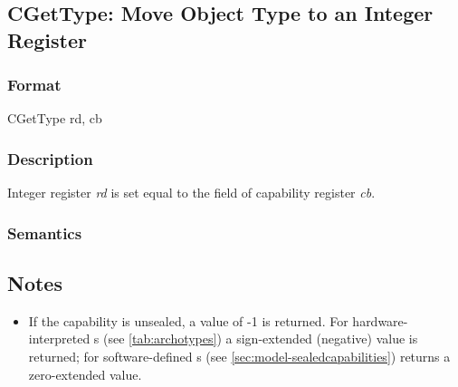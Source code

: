 \clearpage
{}
{}
\subsection*{CGetType: Move Object Type to an Integer Register}

\subsubsection*{Format}

CGetType rd, cb

\begin{center}
\end{center}

\subsubsection*{Description}

Integer register \textit{rd} is set equal to the \cotype{} field of capability
register \textit{cb}.

\subsubsection*{Semantics}

\subsection*{Notes}

\begin{itemize}
\item
If the capability is unsealed, a value of -1 is returned.
For hardware-interpreted \cotype{}s (see \cref{tab:archotypes}) a sign-extended
(negative) value is returned; for software-defined \cotype{}s
(see \cref{sec:model-sealedcapabilities})  returns
a zero-extended value.
\end{itemize}
